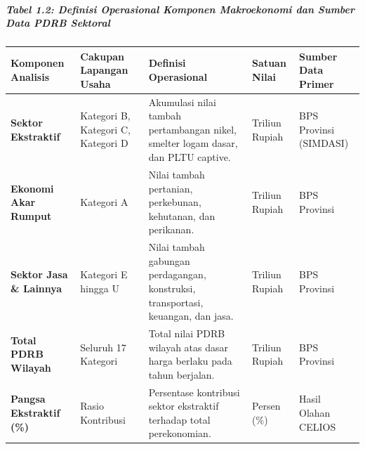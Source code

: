 \documentclass[
]{article}
\newcounter{none} %
\begin{document}
\subparagraph{Tabel 1.2: Definisi Operasional Komponen Makroekonomi dan
Sumber Data PDRB
Sektoral}\label{tabel-1.2-definisi-operasional-komponen-makroekonomi-dan-sumber-data-pdrb-sektoral}

{\def\LTcaptype{none} %
\begin{longtable}[]{@{}
  >{\raggedright\arraybackslash}p{}
  >{\raggedright\arraybackslash}p{}
  >{\raggedright\arraybackslash}p{}
  >{\centering\arraybackslash}p{}
  >{\raggedright\arraybackslash}p{}@{}}
\toprule\noalign{}
\begin{minipage}[b]{\linewidth}\raggedright
Komponen Analisis
\end{minipage} & \begin{minipage}[b]{\linewidth}\raggedright
Cakupan Lapangan Usaha
\end{minipage} & \begin{minipage}[b]{\linewidth}\raggedright
Definisi Operasional
\end{minipage} & \begin{minipage}[b]{\linewidth}\centering
Satuan Nilai
\end{minipage} & \begin{minipage}[b]{\linewidth}\raggedright
Sumber Data Primer
\end{minipage} \\
\midrule\noalign{}
\endhead
\bottomrule\noalign{}
\endlastfoot
\textbf{Sektor Ekstraktif} & Kategori B, Kategori C, Kategori D &
Akumulasi nilai tambah pertambangan nikel, smelter logam dasar, dan PLTU
captive. & Triliun Rupiah & BPS Provinsi (SIMDASI) \\
\textbf{Ekonomi Akar Rumput} & Kategori A & Nilai tambah pertanian,
perkebunan, kehutanan, dan perikanan. & Triliun Rupiah & BPS Provinsi \\
\textbf{Sektor Jasa \& Lainnya} & Kategori E hingga U & Nilai tambah
gabungan perdagangan, konstruksi, transportasi, keuangan, dan jasa. &
Triliun Rupiah & BPS Provinsi \\
\textbf{Total PDRB Wilayah} & Seluruh 17 Kategori & Total nilai PDRB
wilayah atas dasar harga berlaku pada tahun berjalan. & Triliun Rupiah &
BPS Provinsi \\
\textbf{Pangsa Ekstraktif (\%)} & Rasio Kontribusi & Persentase
kontribusi sektor ekstraktif terhadap total perekonomian. & Persen (\%)
& Hasil Olahan CELIOS \\
\end{longtable}
}
\end{document}
